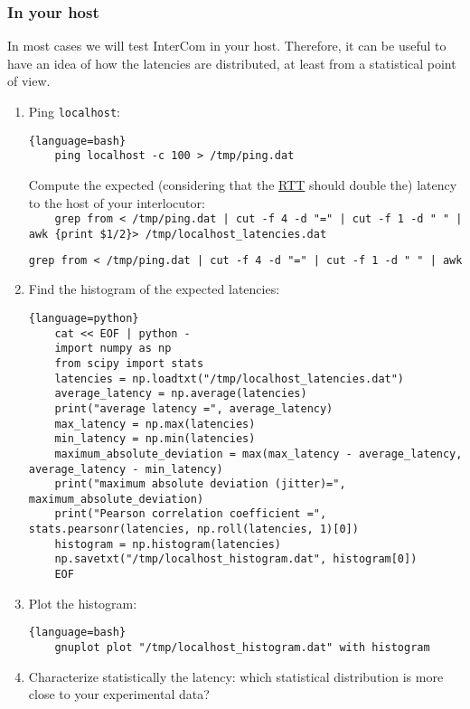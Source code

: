 \subsubsection{In your host}

In most cases we will test InterCom in your host. Therefore, it can be
useful to have an idea of how the latencies are distributed, at least
from a statistical point of view.

\begin{enumerate}
\item Ping \texttt{localhost}:
   \begin{lstlisting}{language=bash}
    ping localhost -c 100 > /tmp/ping.dat
  \end{lstlisting}
Compute the expected (considering that the
  \href{https://en.wikipedia.org/wiki/Round-trip_delay}{RTT} should
  double the) latency to the host of your interlocutor:\\
\texttt{~~~~grep from < /tmp/ping.dat | cut -f 4 -d "=" | cut -f 1 -d " " | awk
  \textquotesingle\{print \$1/2\}\textquotesingle > /tmp/localhost\_latencies.dat}

\begin{lstlisting}[language=tex, mathescape]
  grep from < /tmp/ping.dat | cut -f 4 -d "=" | cut -f 1 -d " " | awk '{print $\mbox{\textdollar}$1/2}' > /tmp/localhost\_latencies.dat
\end{lstlisting}

\item Find the histogram of the expected latencies:
  \begin{lstlisting}{language=python}
    cat << EOF | python -
    import numpy as np
    from scipy import stats
    latencies = np.loadtxt("/tmp/localhost_latencies.dat")
    average_latency = np.average(latencies)
    print("average latency =", average_latency)
    max_latency = np.max(latencies)
    min_latency = np.min(latencies)
    maximum_absolute_deviation = max(max_latency - average_latency, average_latency - min_latency)
    print("maximum absolute deviation (jitter)=", maximum_absolute_deviation)
    print("Pearson correlation coefficient =", stats.pearsonr(latencies, np.roll(latencies, 1)[0])
    histogram = np.histogram(latencies)
    np.savetxt("/tmp/localhost_histogram.dat", histogram[0])
    EOF
  \end{lstlisting}

\item Plot the histogram:
  \begin{lstlisting}{language=bash}
    gnuplot plot "/tmp/localhost_histogram.dat" with histogram
  \end{lstlisting}
  
\item Characterize statistically the latency: which statistical
  distribution is more close to your experimental data?
\end{enumerate}

